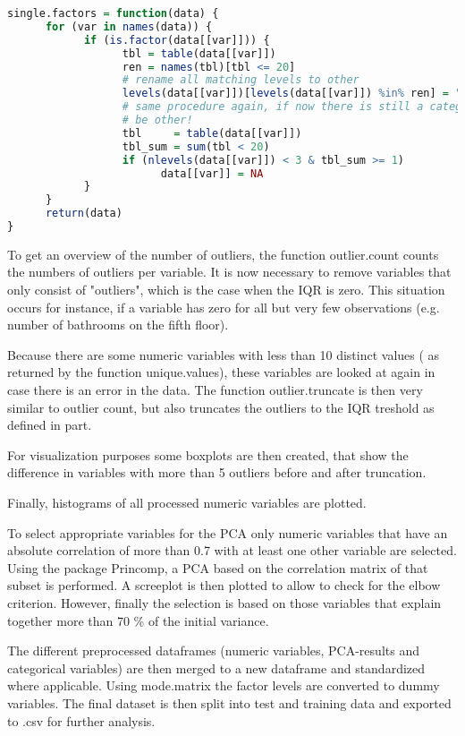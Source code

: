 \begin{lstlisting}[language=R]
single.factors = function(data) {
      for (var in names(data)) {
            if (is.factor(data[[var]])) {
                  tbl = table(data[[var]])
                  ren = names(tbl)[tbl <= 20]
                  # rename all matching levels to other
                  levels(data[[var]])[levels(data[[var]]) %in% ren] = "Other"
                  # same procedure again, if now there is still a category with less than 20 it can only
                  # be other!
                  tbl     = table(data[[var]])
                  tbl_sum = sum(tbl < 20)
                  if (nlevels(data[[var]]) < 3 & tbl_sum >= 1) 
                        data[[var]] = NA
            }
      }
      return(data)
}
\end{lstlisting}


To get an overview of the number of outliers, the function outlier.count  counts the numbers of outliers per variable.
It is now necessary to remove variables that only consist of "outliers", which is the case when the IQR is zero. This situation occurs for instance, if a variable has zero for all but very few observations (e.g. number of bathrooms on the fifth floor). 

Because there are some numeric variables with less than 10 distinct values ( as returned by the function unique.values), these variables are looked at again in case there is an error in the data. 
The function outlier.truncate is then very similar to outlier count, but also truncates the outliers to the IQR treshold as defined in part. 

For visualization purposes some boxplots are then created, that show the difference in variables with more than 5 outliers before and after truncation. 

Finally, histograms of all processed numeric variables are plotted. 


To select appropriate variables for the PCA only numeric variables that have an absolute correlation of more than 0.7 with at least one other variable are selected.  Using the package Princomp, a PCA based on the correlation matrix of that subset is performed. 
A screeplot is then plotted to allow to check for the elbow criterion. 
However, finally the selection is based on those variables that explain together more than 70 \% of the initial variance. 

The different preprocessed dataframes (numeric variables, PCA-results and categorical variables) are then merged to a new dataframe and standardized where applicable. Using mode.matrix the factor levels are converted to dummy variables. The final dataset is then split into test and training data and exported to .csv for further analysis. 
